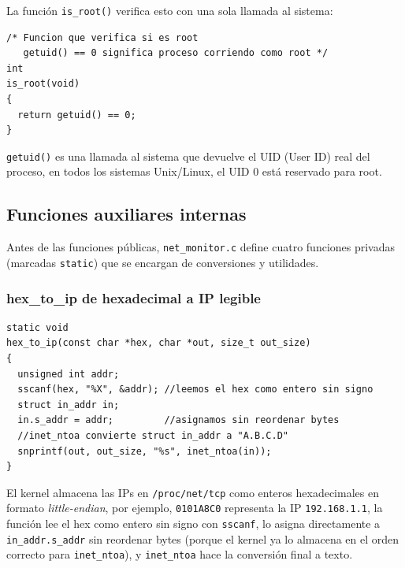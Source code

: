 \documentclass[12pt,letterpaper]{article}
\begin{document}
La función \texttt{is\_root()} verifica esto con una sola llamada al sistema:

\begin{lstlisting}[style=modernc, caption={\texttt{net\_monitor.c} --- is\_root() (líneas 119--125)}]
/* Funcion que verifica si es root
   getuid() == 0 significa proceso corriendo como root */
int
is_root(void)
{
  return getuid() == 0;
}
\end{lstlisting}

\texttt{getuid()} es una llamada al sistema que devuelve el UID (User ID) real del proceso, en todos los
sistemas Unix/Linux, el UID 0 está reservado para root.

\subsection*{Funciones auxiliares internas}

Antes de las funciones públicas, \texttt{net\_monitor.c} define cuatro funciones privadas
(marcadas \texttt{static}) que se encargan de conversiones y utilidades.

\subsubsection*{hex\_to\_ip de hexadecimal a IP legible}

\begin{lstlisting}[style=modernc, caption={\texttt{net\_monitor.c} --- hex\_to\_ip() (líneas 10--24)}]
static void
hex_to_ip(const char *hex, char *out, size_t out_size)
{
  unsigned int addr;
  sscanf(hex, "%X", &addr); //leemos el hex como entero sin signo
  struct in_addr in;
  in.s_addr = addr;         //asignamos sin reordenar bytes
  //inet_ntoa convierte struct in_addr a "A.B.C.D"
  snprintf(out, out_size, "%s", inet_ntoa(in));
}
\end{lstlisting}

El kernel almacena las IPs en \texttt{/proc/net/tcp} como enteros hexadecimales en formato \textit{little-endian}, por ejemplo, \texttt{0101A8C0} representa la IP \texttt{192.168.1.1}, la función lee el hex como entero sin
signo con \texttt{sscanf}, lo asigna directamente a \texttt{in\_addr.s\_addr} sin reordenar bytes (porque el
kernel ya lo almacena en el orden correcto para \texttt{inet\_ntoa}), y \texttt{inet\_ntoa} hace la conversión
final a texto.
\end{document}
